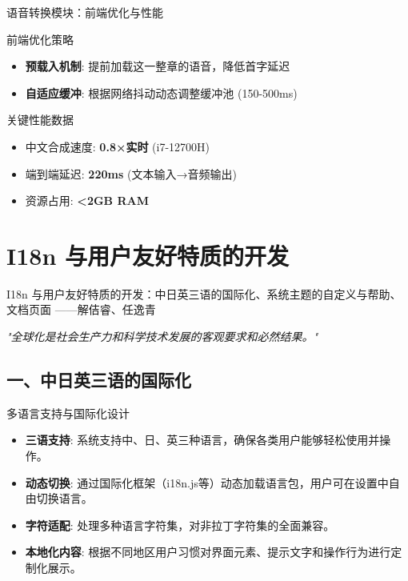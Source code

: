 \documentclass{beamer}
\begin{document}
\begin{frame}{语音转换模块：前端优化与性能}
    \begin{block}{前端优化策略}
        \begin{itemize}
            \item \textbf{预载入机制}: 提前加载这一整章的语音，降低首字延迟
            \item \textbf{自适应缓冲}: 根据网络抖动动态调整缓冲池 (150-500ms)
        \end{itemize}
    \end{block}
    \begin{alertblock}{关键性能数据}
        \begin{itemize}
            \item 中文合成速度: \textbf{0.8×实时} (i7-12700H)
            \item 端到端延迟: \textbf{220ms} (文本输入→音频输出)
            \item 资源占用: \textbf{<2GB RAM}
        \end{itemize}
    \end{alertblock}
\end{frame}


\section{I18n 与用户友好特质的开发}

\begin {frame}{I18n 与用户友好特质的开发：中日英三语的国际化、系统主题的自定义与帮助、文档页面
    \hfill ——解佶睿、任逸青}

\centering
\textit{"全球化是社会生产力和科学技术发展的客观要求和必然结果。"} \\
\vspace {1em}
\end{frame}

\subsection{一、中日英三语的国际化}
\begin{frame}{多语言支持与国际化设计}
    \begin{itemize}
        \item \textbf{三语支持}: 系统支持中、日、英三种语言，确保各类用户能够轻松使用并操作。
        \item \textbf{动态切换}: 通过国际化框架（i18n.js等）动态加载语言包，用户可在设置中自由切换语言。
        \item \textbf{字符适配}: 处理多种语言字符集，对非拉丁字符集的全面兼容。
        \item \textbf{本地化内容}: 根据不同地区用户习惯对界面元素、提示文字和操作行为进行定制化展示。
    \end{itemize}
\end{frame}
\end{document}
